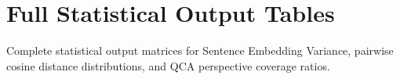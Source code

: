 
\chapter{Full Statistical Output Tables}
\label{app:statistical_tables}

Complete statistical output matrices for Sentence Embedding Variance, pairwise cosine distance distributions, and QCA perspective coverage ratios.

